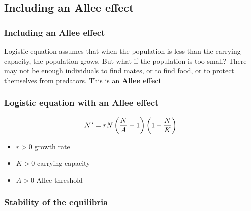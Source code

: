 \documentclass[aspectratio=169]{beamer}
\begin{document}
\subsection{Including an Allee effect}


\begin{frame}\frametitle{Including an Allee effect}
Logistic equation assumes that when the population is less than the carrying capacity, the population grows. But what if the population is too small?
\vfill
There may not be enough individuals to find mates, or to find food, or to protect themselves from predators. This is an \textbf{Allee effect}
\end{frame}

\begin{frame}\frametitle{Logistic equation with an Allee effect}
\begin{equation}\label{eq:logistic-ODE-with-Allee}
N\,'=rN\left(\frac{N}{A}-1\right)\left(1-\frac NK\right)
\end{equation}
\vfill
\begin{itemize}
\item $r>0$ growth rate
\item $K>0$ carrying capacity
\item $A>0$ Allee threshold
\end{itemize}
\end{frame}


\begin{frame}\frametitle{Stability of the equilibria}
\begin{center}
\end{center}
\end{frame}
\end{document}
